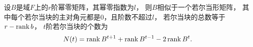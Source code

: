 \begin{corollary}
设\(B\)是域\(F\)上的\(r\)阶幂零矩阵，其幂零指数为\(l\)，
则\(B\)相似于一个若尔当形矩阵，
其中每个若尔当块的主对角元都是\(0\)，且阶数不超过\(l\)，
若尔当块的总数等于\(r - \rank b\)，
\(t\)阶若尔当块的个数为\begin{equation}
	N(t) = \rank B^{t+1} + \rank B^{t-1} - 2 \rank B^t.
\end{equation}
\end{corollary}

